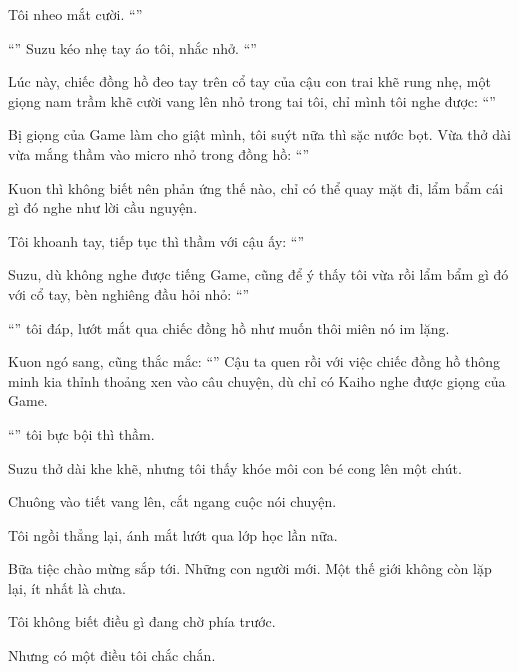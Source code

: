 \documentclass[../main.tex]{subfiles}
\begin{document}
Tôi nheo mắt cười. ``''

``'' Suzu kéo nhẹ tay áo tôi, nhắc nhở. ``''

Lúc này, chiếc đồng hồ đeo tay trên cổ tay của cậu con trai khẽ rung nhẹ, một giọng nam trầm khẽ cười vang lên nhỏ trong tai tôi, chỉ mình tôi nghe được: ``''

Bị giọng của Game làm cho giật mình, tôi suýt nữa thì sặc nước bọt. Vừa thở dài vừa mắng thầm vào micro nhỏ trong đồng hồ: ``''

Kuon thì không biết nên phản ứng thế nào, chỉ có thể quay mặt đi, lẩm bẩm cái gì đó nghe như lời cầu nguyện.

Tôi khoanh tay, tiếp tục thì thầm với cậu ấy: ``''

Suzu, dù không nghe được tiếng Game, cũng để ý thấy tôi vừa rồi lẩm bẩm gì đó với cổ tay, bèn nghiêng đầu hỏi nhỏ: ``''

``'' tôi đáp, lướt mắt qua chiếc đồng hồ như muốn thôi miên nó im lặng.

Kuon ngó sang, cũng thắc mắc: ``'' Cậu ta quen rồi với việc chiếc đồng hồ thông minh kia thỉnh thoảng xen vào câu chuyện, dù chỉ có Kaiho nghe được giọng của Game.

``'' tôi bực bội thì thầm.

Suzu thở dài khe khẽ, nhưng tôi thấy khóe môi con bé cong lên một chút.

\il

Chuông vào tiết vang lên, cắt ngang cuộc nói chuyện.

Tôi ngồi thẳng lại, ánh mắt lướt qua lớp học lần nữa.

Bữa tiệc chào mừng sắp tới. Những con người mới. Một thế giới không còn lặp lại, ít nhất là chưa.

Tôi không biết điều gì đang chờ phía trước.

Nhưng có một điều tôi chắc chắn.
\end{document}
